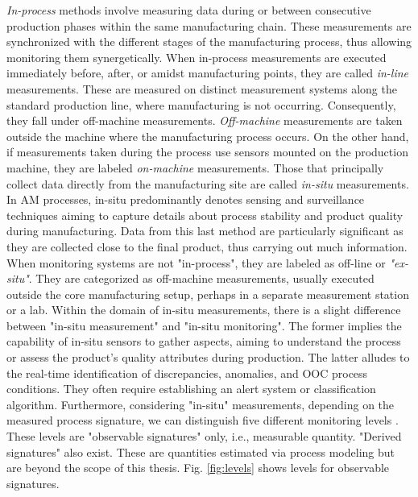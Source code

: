 \emph{In-process} methods involve measuring data during or between consecutive production phases within the same manufacturing chain. These measurements are synchronized with the different stages of the manufacturing process, thus allowing monitoring them synergetically. When in-process measurements are executed immediately before, after, or amidst manufacturing points, they are called \emph{in-line} measurements. These are measured on distinct measurement systems along the standard production line, where manufacturing is not occurring. Consequently, they fall under off-machine measurements. \emph{Off-machine} measurements are taken outside the machine where the manufacturing process occurs. On the other hand, if measurements taken during the process use sensors mounted on the production machine, they are labeled \emph{on-machine} measurements. Those that principally collect data directly from the manufacturing site are called \emph{in-situ} measurements. In AM processes, in-situ predominantly denotes sensing and surveillance techniques aiming to capture details about process stability and product quality during manufacturing. Data from this last method are particularly significant as they are collected close to the final product, thus carrying out much information. When monitoring systems are not "in-process", they are labeled as off-line or \emph{"ex-situ"}. They are categorized as off-machine measurements, usually executed outside the core manufacturing setup, perhaps in a separate measurement station or a lab. Within the domain of in-situ measurements, there is a slight difference between "in-situ measurement" and "in-situ monitoring". The former implies the capability of in-situ sensors to gather aspects, aiming to understand the process or assess the product's quality attributes during production. The latter alludes to the real-time identification of discrepancies, anomalies, and OOC process conditions. They often require establishing an alert system or classification algorithm. Furthermore, considering "in-situ" measurements, depending on the measured process signature, we can distinguish five different monitoring levels \cite{grasso_-situ_2021, grasso_process_2017}. These levels are "observable signatures" only, i.e., measurable quantity. "Derived signatures" also exist. These are quantities estimated via process modeling but are beyond the scope of this thesis. Fig. \ref{fig:levels} shows levels for observable signatures.
